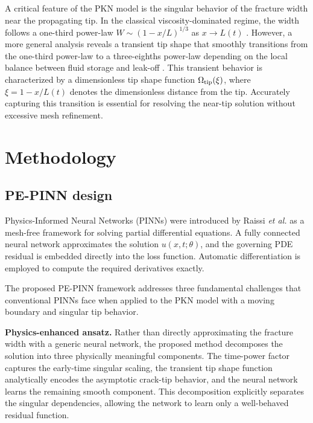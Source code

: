 \documentclass{ws-ijcm}
\begin{document}
A critical feature of the PKN model is the singular behavior of the
fracture width near the propagating tip. In the classical
viscosity-dominated regime, the width follows a one-third power-law
$W \sim (1 - x/L)^{1/3}$ as $x \to L(t)$
\cite{Nordgren1972,Kemp1990}. However, a more general analysis reveals
a transient tip shape that smoothly transitions from the one-third
power-law to a three-eighths power-law depending on the local balance
between fluid storage and leak-off \cite{Linkov2015}. This transient
behavior is characterized by a dimensionless tip shape function
$\Omega_{\rm tip}(\xi)$, where $\xi = 1 - x/L(t)$ denotes the
dimensionless distance from the tip. Accurately capturing this
transition is essential for resolving the near-tip solution without
excessive mesh refinement.

\section{Methodology}

\subsection{PE-PINN design}

Physics-Informed Neural Networks (PINNs) were introduced by Raissi
\emph{et al.} \cite{Raissi2019} as a mesh-free framework for solving
partial differential equations. A fully connected neural network
approximates the solution $u(x, t; \theta)$, and the governing PDE
residual is embedded directly into the loss function. Automatic
differentiation is employed to compute the required derivatives exactly.

The proposed PE-PINN framework addresses three fundamental challenges
that conventional PINNs face when applied to the PKN model with a
moving boundary and singular tip behavior.

\textbf{Physics-enhanced ansatz.} Rather than directly approximating
the fracture width with a generic neural network, the proposed method
decomposes the solution into three physically meaningful components.
The time-power factor captures the early-time singular scaling, the
transient tip shape function analytically encodes the asymptotic
crack-tip behavior, and the neural network learns the remaining smooth
component. This decomposition explicitly separates the singular
dependencies, allowing the network to learn only a well-behaved
residual function.
\end{document}
